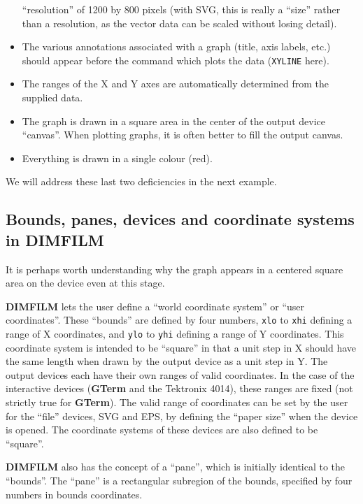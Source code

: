 \documentclass[a4paper,twoside,11pt]{article}
\newcommand{\newpara}{\par\vspace{4mm}\noindent}
\begin{document}
\begin{itemize}
``resolution'' of 1200 by 800 pixels (with SVG, this is
really a ``size'' rather than a resolution, as the vector data can be scaled without losing detail).
\item The various annotations associated with a graph (title, axis labels, etc.) should appear before the command which plots the data
(\texttt{XYLINE} here).
\item The ranges of the X and Y axes are automatically determined from the supplied data.
\item The graph is drawn in a square area in the center of the output device ``canvas''. 
When plotting graphs, it is often better to fill the output canvas.
\item Everything is drawn in a single colour (red).
\end{itemize}

\newpara
We will address these last two deficiencies in the next example.

\subsection{Bounds, panes, devices and coordinate systems in \textbf{DIMFILM}}

\newpara
It is perhaps worth understanding why the graph appears in a centered square area on the device
even at this stage. 

\newpara
\textbf{DIMFILM} lets the user define a ``world coordinate system'' or ``user coordinates''.
These ``bounds''
are defined by four numbers,
\texttt{xlo} to \texttt{xhi} defining a range of X coordinates, and
\texttt{ylo} to \texttt{yhi} defining a range of Y coordinates. This
coordinate system is intended to be ``square'' in that a unit step in X
should have the same length when drawn by the output device as a unit
step in Y. The output devices each have their own ranges of valid
coordinates. In the case of the interactive devices (\textbf{GTerm} and the
Tektronix 4014), these ranges are fixed (not strictly true for \textbf{GTerm}).
The valid range of coordinates can be set by the user for the ``file''
devices, SVG and EPS, by defining the ``paper size'' when the device is
opened. The coordinate systems of these devices are also defined to be
``square''.

\newpara
\textbf{DIMFILM} also has the concept of a ``pane'', which is initially identical
to the ``bounds''. The ``pane'' is a rectangular subregion of the
bounds, specified by four numbers in bounds coordinates.
\end{document}
